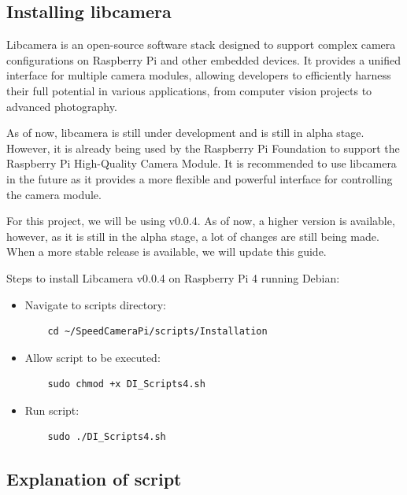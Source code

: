 \subsection{Installing libcamera}

Libcamera is an open-source software stack designed to support complex camera configurations on Raspberry Pi and other embedded devices. It provides a unified interface for multiple camera modules, allowing developers to efficiently harness their full potential in various applications, from computer vision projects to advanced photography.

As of now, libcamera is still under development and is still in alpha stage. However, it is already being used by the Raspberry Pi Foundation to support the Raspberry Pi High-Quality Camera Module. It is recommended to use libcamera in the future as it provides a more flexible and powerful interface for controlling the camera module.

For this project, we will be using v0.0.4. As of now, a higher version is available, however, as it is still in the alpha stage, a lot of changes are still being made. When a more stable release is available, we will update this guide.

Steps to install Libcamera v0.0.4 on Raspberry Pi 4 running Debian:

\begin{itemize}
      \item Navigate to scripts directory:

            \begin{lstlisting}
    cd ~/SpeedCameraPi/scripts/Installation
    \end{lstlisting}

      \item Allow script to be executed:

            \begin{lstlisting}
    sudo chmod +x DI_Scripts4.sh
    \end{lstlisting}

      \item Run script:

            \begin{lstlisting}
    sudo ./DI_Scripts4.sh
    \end{lstlisting}
\end{itemize}

\subsection{Explanation of script}

